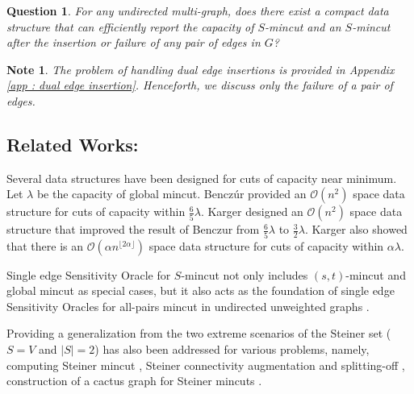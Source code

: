 \documentclass[letterpaper,11pt]{article}
\newtheorem{question}{Question}[]
\newtheorem{note}{Note}[]
\begin{document}
\begin{question} \label{ques : dual edge}
    For any undirected multi-graph, does there exist a compact data structure that can efficiently report the capacity of $S$-mincut and an $S$-mincut after the insertion or failure of any pair of edges in $G$?
\end{question}


\begin{note}
The problem of handling dual edge insertions is provided in Appendix \ref{app : dual edge insertion}. Henceforth, we discuss only the failure of a pair of edges.
\end{note}










\subsection{Related Works:} 
Several data structures have been designed for cuts of capacity near minimum. Let $\lambda$ be the capacity of global mincut.  Bencz\'ur \cite{DBLP:conf/focs/Benczur95} provided an ${\mathcal O}(n^2)$ space data structure for cuts of capacity within $\frac{6}{5}\lambda$. Karger \cite{DBLP:journals/jacm/Karger00} designed an ${\mathcal O}(n^2)$ space data structure that improved the result of Benczur \cite{DBLP:conf/focs/Benczur95} from $\frac{6}{5}\lambda$ to $\frac{3}{2}\lambda$. Karger \cite{DBLP:journals/jacm/Karger00} also showed that there is an ${\mathcal O}(\alpha n^{\lfloor 2\alpha\rfloor})$ space data structure for cuts of capacity within $\alpha\lambda$.

\noindent
Single edge Sensitivity Oracle for $S$-mincut \cite{DBLP:conf/soda/BaswanaP22, DBLP:conf/stoc/DinitzV94, DBLP:conf/soda/DinitzV95, DBLP:journals/siamcomp/DinitzV00} not only includes $(s,t)$-mincut \cite{DBLP:journals/mp/PicardQ80, DBLP:journals/talg/BaswanaBP23} and global mincut \cite{dinitz1976structure} as special cases, but it also acts as the foundation of single edge Sensitivity Oracles for all-pairs mincut in undirected unweighted graphs \cite{DBLP:conf/soda/BaswanaP22}. 


\noindent
Providing a generalization from the two extreme scenarios of the Steiner set ($S=V$ and $|S|=2$) has also been addressed for various problems, namely, computing Steiner mincut \cite{DBLP:conf/stoc/DinitzV94, DBLP:journals/siamcomp/DinitzV00, DBLP:conf/stoc/ColeH03, DBLP:conf/soda/HeHS24, DBLP:journals/corr/abs-1912-11103}, Steiner connectivity augmentation and splitting-off \cite{DBLP:conf/soda/CenH0P23}, construction of a cactus graph for Steiner mincuts \cite{DBLP:journals/siamcomp/DinitzV00, DBLP:conf/soda/HeHS24}.
\end{document}
